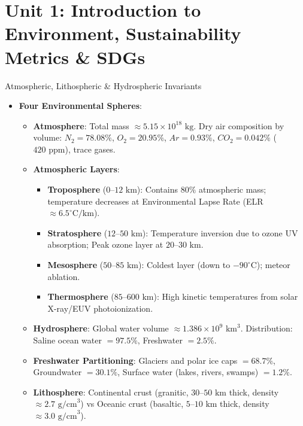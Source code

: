\chapter{Unit 1: Introduction to Environment, Sustainability Metrics \& SDGs}

\begin{formulabox}{Atmospheric, Lithospheric \& Hydrospheric Invariants}
\begin{itemize}[leftmargin=1.2em]
    \item \textbf{Four Environmental Spheres}:
    \begin{itemize}
        \item \textbf{Atmosphere}: Total mass $\approx 5.15 \times 10^{18}\text{ kg}$. Dry air composition by volume: $N_2 = 78.08\%$, $O_2 = 20.95\%$, $Ar = 0.93\%$, $CO_2 = 0.042\%$ ($420\text{ ppm}$), trace gases.
        \item \textbf{Atmospheric Layers}:
        \begin{itemize}
            \item \textbf{Troposphere} ($0\text{--}12\text{ km}$): Contains $80\%$ atmospheric mass; temperature decreases at Environmental Lapse Rate (ELR $\approx 6.5^\circ\text{C/km}$).
            \item \textbf{Stratosphere} ($12\text{--}50\text{ km}$): Temperature inversion due to ozone UV absorption; Peak ozone layer at $20\text{--}30\text{ km}$.
            \item \textbf{Mesosphere} ($50\text{--}85\text{ km}$): Coldest layer (down to $-90^\circ\text{C}$); meteor ablation.
            \item \textbf{Thermosphere} ($85\text{--}600\text{ km}$): High kinetic temperatures from solar X-ray/EUV photoionization.
        \end{itemize}
        \item \textbf{Hydrosphere}: Global water volume $\approx 1.386 \times 10^9\text{ km}^3$. Distribution: Saline ocean water $= 97.5\%$, Freshwater $= 2.5\%$.
        \item \textbf{Freshwater Partitioning}: Glaciers and polar ice caps $= 68.7\%$, Groundwater $= 30.1\%$, Surface water (lakes, rivers, swamps) $= 1.2\%$.
        \item \textbf{Lithosphere}: Continental crust (granitic, $30\text{--}50\text{ km}$ thick, density $\approx 2.7\text{ g/cm}^3$) vs Oceanic crust (basaltic, $5\text{--}10\text{ km}$ thick, density $\approx 3.0\text{ g/cm}^3$).
    \end{itemize}
\end{itemize}
\end{formulabox}

